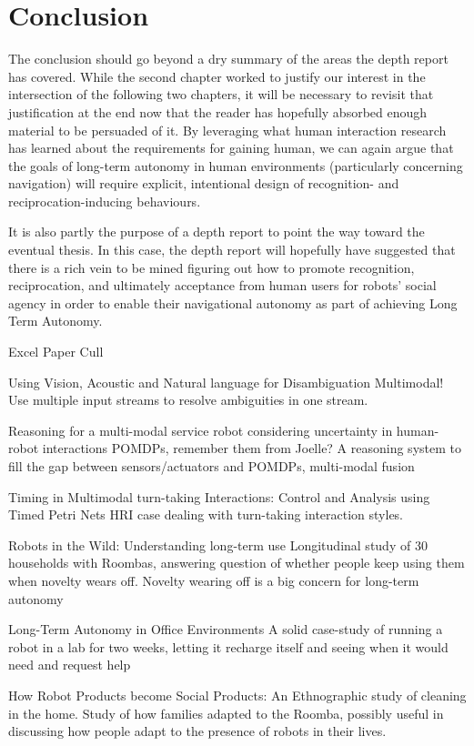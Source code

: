 \documentclass{sfuthesis}
\begin{document}
\chapter{Conclusion}

The conclusion should go beyond a dry summary of the areas the depth report has covered. While the second chapter worked to justify our interest in the intersection of the following two chapters, it will be necessary to revisit that justification at the end now that the reader has hopefully absorbed enough material to be persuaded of it. By leveraging what human interaction research has learned about the requirements for gaining human, we can again argue that the goals of long-term autonomy in human environments (particularly concerning navigation) will require explicit, intentional design of recognition- and reciprocation-inducing behaviours.

It is also partly the purpose of a depth report to point the way toward the eventual thesis. In this case, the depth report will hopefully have suggested that there is a rich vein to be mined figuring out how to promote recognition, reciprocation, and ultimately acceptance from human users for robots' social agency in order to enable their navigational autonomy as part of achieving Long Term Autonomy.




Excel Paper Cull

Using Vision, Acoustic and Natural language for Disambiguation	Multimodal! Use multiple input streams to resolve ambiguities in one stream.

Reasoning for a multi-modal service robot considering uncertainty in human-robot interactions	POMDPs, remember them from Joelle? A reasoning system to fill the gap between sensors/actuators and POMDPs, multi-modal fusion

Timing in Multimodal turn-taking Interactions: Control and Analysis using Timed Petri Nets	HRI case dealing with turn-taking interaction styles.

Robots in the Wild: Understanding long-term use	Longitudinal study of 30 households with Roombas, answering question of whether people keep using them when novelty wears off. Novelty wearing off is a big concern for long-term autonomy	

Long-Term Autonomy in Office Environments	A solid case-study of running a robot in a lab for two weeks, letting it recharge itself and seeing when it would need and request help	

How Robot Products become Social Products: An Ethnographic study of cleaning in the home.	Study of how families adapted to the Roomba, possibly useful in discussing how people adapt to the presence of robots in their lives.	
\end{document}
